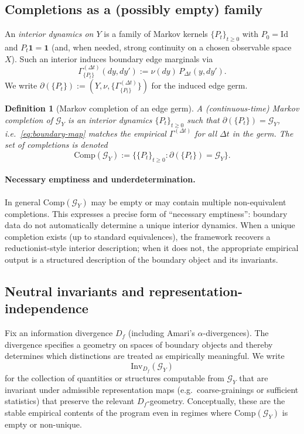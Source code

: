 \documentclass[11pt]{article}
\newtheorem{definition}{Definition}
\begin{document}
\subsection{Completions as a (possibly empty) family}
An \emph{interior dynamics on $Y$} is a family of Markov kernels $\{P_t\}_{t\ge 0}$ with $P_0=\mathrm{Id}$
and $P_t\mathbf 1=\mathbf 1$ (and, when needed, strong continuity on a chosen observable space $X$).
Such an interior induces boundary edge marginals via
\begin{equation}
  \Gamma_{\{P_t\}}^{(\Delta t)}(dy,dy') := \nu(dy)\,P_{\Delta t}(y,dy').
  \label{eq:boundary-map}
\end{equation}
We write $\partial(\{P_t\}) := (Y,\nu,\{\Gamma_{\{P_t\}}^{(\Delta t)}\})$ for the induced edge germ.

\begin{definition}[Markov completion of an edge germ]
A \emph{(continuous-time) Markov completion} of $\mathcal G_Y$ is an interior dynamics $\{P_t\}_{t\ge 0}$
such that $\partial(\{P_t\})=\mathcal G_Y$, i.e.\ \eqref{eq:boundary-map} matches the empirical
$\Gamma^{(\Delta t)}$ for all $\Delta t$ in the germ. The set of completions is denoted
\[
  \mathrm{Comp}(\mathcal G_Y) := \big\{\{P_t\}_{t\ge 0} : \partial(\{P_t\})=\mathcal G_Y\big\}.
\]
\end{definition}

\paragraph{Necessary emptiness and underdetermination.}
In general $\mathrm{Comp}(\mathcal G_Y)$ may be empty or may contain multiple non-equivalent completions.
This expresses a precise form of ``necessary emptiness'': boundary data do not automatically determine a
unique interior dynamics. When a unique completion exists (up to standard equivalences), the framework
recovers a reductionist-style interior description; when it does not, the appropriate empirical output
is a structured description of the boundary object and its invariants.

\subsection{Neutral invariants and representation-independence}
Fix an information divergence $D_f$ (including Amari's $\alpha$-divergences). The divergence specifies a
geometry on spaces of boundary objects and thereby determines which distinctions are treated as
empirically meaningful. We write
\[
  \mathrm{Inv}_{D_f}(\mathcal G_Y)
\]
for the collection of quantities or structures computable from $\mathcal G_Y$ that are invariant under
admissible representation maps (e.g.\ coarse-grainings or sufficient statistics) that preserve the
relevant $D_f$-geometry. Conceptually, these are the stable empirical contents of the program even in
regimes where $\mathrm{Comp}(\mathcal G_Y)$ is empty or non-unique.
\end{document}
